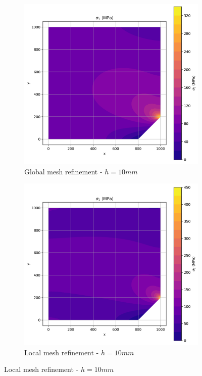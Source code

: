 \begin{figure}[H]
  \centering
  \begin{subfigure}[b]{0.45\textwidth}
    \centering
    \includegraphics[width=\textwidth]{GRAFICOS/Quad4/1.25mm_global/resultados - sigma_1.png}
    \caption{Global mesh refinement - $h=10mm$}
    \label{fig:img13}
  \end{subfigure}
  \hfill
  \begin{subfigure}[b]{0.45\textwidth}
    \centering
    \includegraphics[width=\textwidth]{GRAFICOS/Quad4/1.25mm_local/resultados - sigma_1.png}
    \caption{Local mesh refinement - $h=10mm$}
    \label{fig:img23}
  \end{subfigure}
\end{figure}

